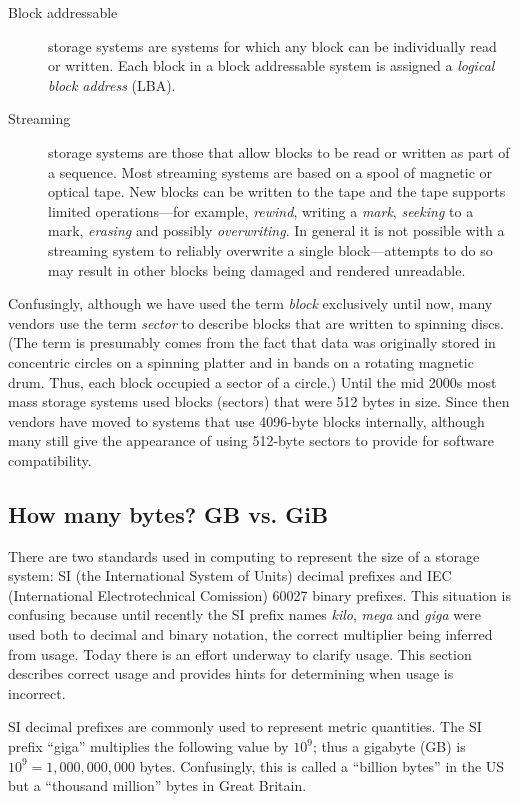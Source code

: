 \begin{description}
\item[Block addressable] storage systems are systems for which any
  block can be individually read or written. Each block in a block
  addressable system is assigned a \emph{logical block address}
  (LBA). 
\item[Streaming] storage systems are those that allow blocks to be
  read or written as part of a sequence. Most streaming systems are
  based on a spool of magnetic or optical tape. New blocks can be
  written to the tape and the tape supports limited operations---for
  example, \emph{rewind}, writing a \emph{mark}, \emph{seeking} to a mark,
   \emph{erasing} and possibly \emph{overwriting}. In general it is
   not possible with a streaming system to reliably overwrite a single
   block---attempts to do so may result in other blocks being damaged
   and rendered unreadable.
\end{description}

Confusingly, although we have used the term \emph{block} exclusively
until now, many vendors use the term \emph{sector} to describe blocks
that are written to spinning discs. (The term is presumably comes from
the fact that data was originally stored in concentric circles on a spinning platter
and in bands on a rotating magnetic drum. Thus, each block occupied a
sector of a circle.) Until the mid 2000s most mass storage systems
used blocks (sectors) that were 512 bytes in size. Since then vendors
have moved to systems that use 4096-byte blocks internally, although
many still give the appearance of using 512-byte sectors to provide
for software compatibility. 

\subsection{How many bytes? GB vs. GiB}

There are two standards used in computing to represent the size of a
storage system: SI (the International System of Units) decimal
prefixes and IEC (International Electrotechnical Comission) 60027
binary prefixes. This situation is confusing because until recently
the SI prefix names \emph{kilo}, \emph{mega} and \emph{giga} were used
both to decimal and binary notation, the correct multiplier being
inferred from usage. Today there is an effort underway to clarify
usage. This section describes correct usage and provides hints for
determining when usage is incorrect.

SI decimal prefixes are commonly used to represent metric
quantities. The SI prefix ``giga'' multiplies the following value by $10^9$; thus a gigabyte (GB) is
$10^9=1,000,000,000$ bytes. Confusingly, this is called a ``billion
bytes'' in the US but a ``thousand million'' bytes in Great Britain.

